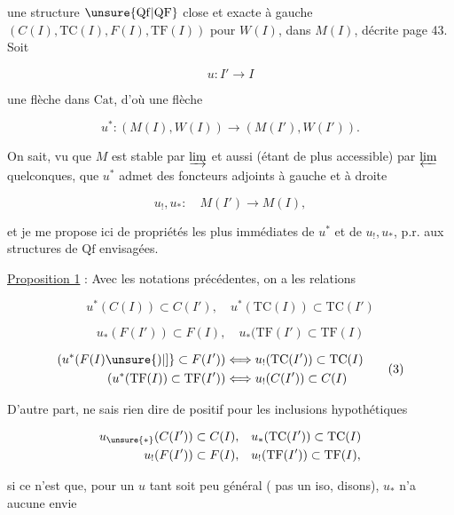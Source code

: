 
une structure $\unsure{\mathrm{Qf}|\mathrm{QF}}$ close et exacte à gauche $(C(I),\mathrm{TC}(I),F(I),\mathrm{TF}(I))$ pour $W(I)$, dans $M(I)$, décrite page 43. Soit  

\[ u:I'\longrightarrow I \]

une flèche dans $\mathrm{Cat}$, d'où une flèche

\[ u^*:(M(I),W(I))\longrightarrow(M(I'),W(I')). \]

On sait, vu que $M$ est stable par $\varinjlim$  et aussi (étant de plus accessible) par $\varprojlim$ quelconques, que $u^*$ admet des foncteurs adjoints à gauche et à droite

\[ u_!,u_*:\quad M(I')\longrightarrow M(I), \]

et je me propose ici de   propriétés les plus immédiates de $u^*$ et de $u_!,u_*$, p.r. aux structures de $\mathrm{Qf}$ envisagées.

\uline{Proposition 1} : Avec les notations précédentes, on a les relations

\[ u^*(C(I))\subset C(I'),\quad u^*(\mathrm{TC}(I))\subset\mathrm{TC}(I') \tag*{(1)} \]

\[ u_*(F(I'))\subset F(I),\quad u_*(\mathrm{TF}(I')\subset\mathrm{TF}(I) \tag*{(2)} \]

\[ \begin{aligned}
(u^*(F(I)\unsure{)|]}\subset F(I'))&\Longleftrightarrow u_!(\mathrm{TC}(I'))\subset\mathrm{TC}(I)\\
(u^*(\mathrm{TF}(I))\subset\mathrm{TF}(I'))&\Longleftrightarrow u_!(C(I'))\subset C(I)
\end{aligned} \tag*{(3)} \]

D'autre part,  ne  sais rien dire de positif pour les inclusions hypothétiques

\[ \begin{aligned}
u_{\unsure{*}}(C(I'))\subset C(I),&\quad u_*(\mathrm{TC}(I'))\subset\mathrm{TC}(I)\\
u_!(F(I'))\subset F(I),&\quad u_!(\mathrm{TF}(I'))\subset\mathrm{TF}(I),
\end{aligned} \]

si ce n'est que, pour un $u$ tant soit peu général ( pas un iso, disons), $u_*$ n'a aucune envie

